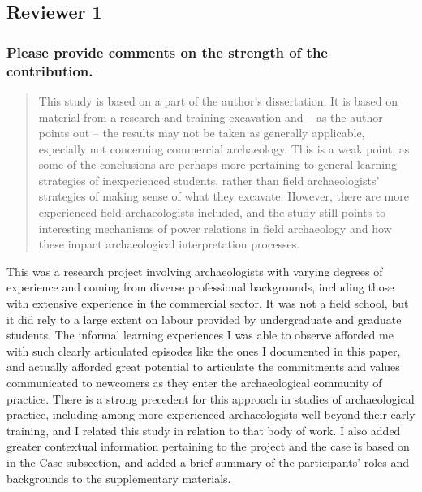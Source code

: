\documentclass[
]{article}
\begin{document}
\subsection{Reviewer 1}\label{reviewer-1}

\subsubsection{Please provide comments on the strength of the
contribution.}\label{please-provide-comments-on-the-strength-of-the-contribution.}

\begin{quote}
This study is based on a part of the author's dissertation. It is based
on material from a research and training excavation and -- as the author
points out -- the results may not be taken as generally applicable,
especially not concerning commercial archaeology. This is a weak point,
as some of the conclusions are perhaps more pertaining to general
learning strategies of inexperienced students, rather than field
archaeologists' strategies of making sense of what they excavate.
However, there are more experienced field archaeologists included, and
the study still points to interesting mechanisms of power relations in
field archaeology and how these impact archaeological interpretation
processes.
\end{quote}

This was a research project involving archaeologists with varying
degrees of experience and coming from diverse professional backgrounds,
including those with extensive experience in the commercial sector. It
was not a field school, but it did rely to a large extent on labour
provided by undergraduate and graduate students. The informal learning
experiences I was able to observe afforded me with such clearly
articulated episodes like the ones I documented in this paper, and
actually afforded great potential to articulate the commitments and
values communicated to newcomers as they enter the archaeological
community of practice. There is a strong precedent for this approach in
studies of archaeological practice, including among more experienced
archaeologists well beyond their early training, and I related this
study in relation to that body of work. I also added greater contextual
information pertaining to the project and the case is based on in the
Case subsection, and added a brief summary of the participants' roles
and backgrounds to the supplementary materials.
\end{document}
